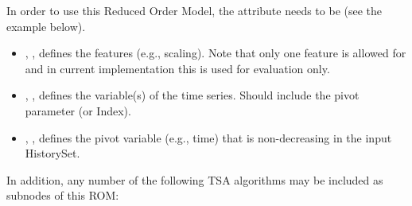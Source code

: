 %
In order to use this Reduced Order Model, the  attribute
 needs to be  (see the example
below).
%
\subnodeIntro

\begin{itemize}
  \item {}, , defines the features (e.g., scaling). Note that only
  one feature is allowed for  and in current implementation this is used for evaluation only.
  \item {}, , defines the variable(s) of the
    time series.  Should include the pivot parameter (or Index).
  \item {}, , defines the pivot variable (e.g., time) that is non-decreasing in
  the input HistorySet.
\end{itemize}

In addition, any number of the following TSA algorithms may be included as subnodes of this ROM:

